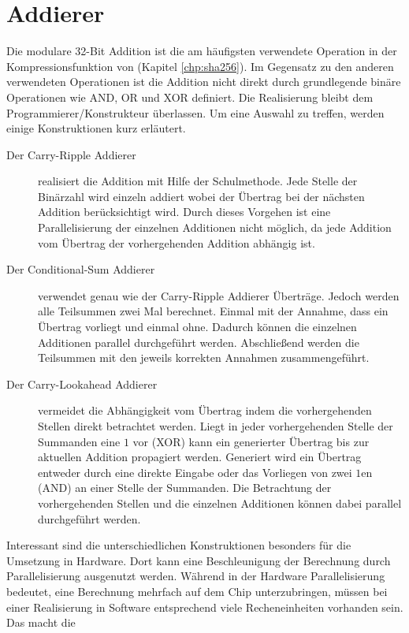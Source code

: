 \section{Addierer}
\label{sec:grundlagen_add}

Die modulare 32-Bit Addition ist die am häufigsten verwendete Operation in der Kompressionsfunktion von  (Kapitel \ref{chp:sha256}).
Im Gegensatz zu den anderen verwendeten Operationen ist die Addition nicht direkt durch grundlegende binäre Operationen wie AND, OR und XOR definiert.
Die Realisierung bleibt dem Programmierer/Konstrukteur überlassen. Um eine Auswahl zu treffen, werden einige Konstruktionen kurz erläutert.
\begin{description}
  \item[Der Carry-Ripple Addierer] realisiert die Addition mit Hilfe der Schulmethode. Jede Stelle der Binärzahl wird einzeln addiert wobei der Übertrag bei der nächsten
                                   Addition berücksichtigt wird. Durch dieses Vorgehen ist eine Parallelisierung der einzelnen Additionen nicht möglich, da jede
                                   Addition vom Übertrag der vorhergehenden Addition abhängig ist.
  \item[Der Conditional-Sum Addierer] verwendet genau wie der Carry-Ripple Addierer Überträge. Jedoch werden alle Teilsummen zwei Mal berechnet. Einmal mit der Annahme,
                                      dass ein Übertrag vorliegt und einmal ohne. Dadurch können die einzelnen Additionen parallel durchgeführt werden. Abschließend
                                      werden die Teilsummen mit den jeweils korrekten Annahmen zusammengeführt.
  \item[Der Carry-Lookahead Addierer] vermeidet die Abhängigkeit vom Übertrag indem die vorhergehenden Stellen direkt betrachtet werden. Liegt in jeder vorhergehenden
                                      Stelle der Summanden eine $1$ vor (XOR) kann ein generierter Übertrag bis zur aktuellen Addition propagiert werden. Generiert wird
                                      ein Übertrag entweder durch eine direkte Eingabe oder das Vorliegen von zwei $1$en (AND) an einer Stelle der Summanden. Die Betrachtung
                                      der vorhergehenden Stellen und die einzelnen Additionen können dabei parallel durchgeführt werden.
\end{description}
Interessant sind die unterschiedlichen Konstruktionen besonders für die Umsetzung in Hardware. Dort kann eine Beschleunigung der Berechnung durch Parallelisierung
ausgenutzt werden. Während in der Hardware Parallelisierung bedeutet, eine Berechnung mehrfach auf dem Chip unterzubringen, müssen bei einer Realisierung in Software
entsprechend viele Recheneinheiten vorhanden sein. Das macht die 

